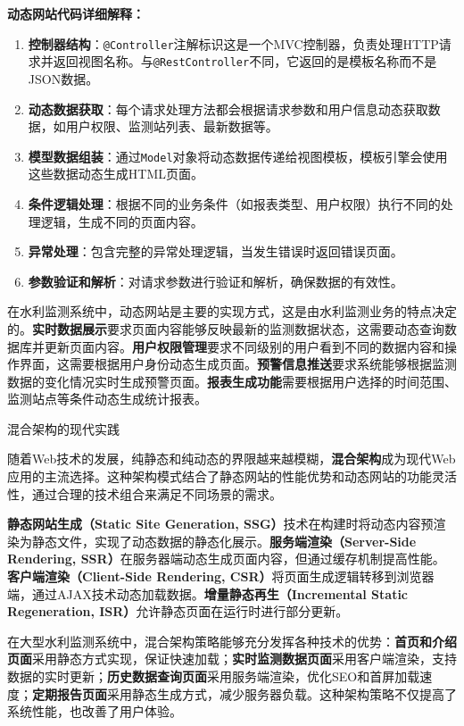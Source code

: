\textbf{动态网站代码详细解释：}

\begin{enumerate}
\def\labelenumi{\arabic{enumi}.}
\item
  \textbf{控制器结构}：\texttt{@Controller}注解标识这是一个MVC控制器，负责处理HTTP请求并返回视图名称。与\texttt{@RestController}不同，它返回的是模板名称而不是JSON数据。
\item
  \textbf{动态数据获取}：每个请求处理方法都会根据请求参数和用户信息动态获取数据，如用户权限、监测站列表、最新数据等。
\item
  \textbf{模型数据组装}：通过\texttt{Model}对象将动态数据传递给视图模板，模板引擎会使用这些数据动态生成HTML页面。
\item
  \textbf{条件逻辑处理}：根据不同的业务条件（如报表类型、用户权限）执行不同的处理逻辑，生成不同的页面内容。
\item
  \textbf{异常处理}：包含完整的异常处理逻辑，当发生错误时返回错误页面。
\item
  \textbf{参数验证和解析}：对请求参数进行验证和解析，确保数据的有效性。
\end{enumerate}

在水利监测系统中，动态网站是主要的实现方式，这是由水利监测业务的特点决定的。\textbf{实时数据展示}要求页面内容能够反映最新的监测数据状态，这需要动态查询数据库并更新页面内容。\textbf{用户权限管理}要求不同级别的用户看到不同的数据内容和操作界面，这需要根据用户身份动态生成页面。\textbf{预警信息推送}要求系统能够根据监测数据的变化情况实时生成预警页面。\textbf{报表生成功能}需要根据用户选择的时间范围、监测站点等条件动态生成统计报表。

 混合架构的现代实践

随着Web技术的发展，纯静态和纯动态的界限越来越模糊，\textbf{混合架构}成为现代Web应用的主流选择。这种架构模式结合了静态网站的性能优势和动态网站的功能灵活性，通过合理的技术组合来满足不同场景的需求。

\textbf{静态网站生成（Static Site Generation, SSG）}技术在构建时将动态内容预渲染为静态文件，实现了动态数据的静态化展示。\textbf{服务端渲染（Server-Side Rendering, SSR）}在服务器端动态生成页面内容，但通过缓存机制提高性能。\textbf{客户端渲染（Client-Side Rendering, CSR）}将页面生成逻辑转移到浏览器端，通过AJAX技术动态加载数据。\textbf{增量静态再生（Incremental Static Regeneration, ISR）}允许静态页面在运行时进行部分更新。

在大型水利监测系统中，混合架构策略能够充分发挥各种技术的优势：\textbf{首页和介绍页面}采用静态方式实现，保证快速加载；\textbf{实时监测数据页面}采用客户端渲染，支持数据的实时更新；\textbf{历史数据查询页面}采用服务端渲染，优化SEO和首屏加载速度；\textbf{定期报告页面}采用静态生成方式，减少服务器负载。这种架构策略不仅提高了系统性能，也改善了用户体验。

